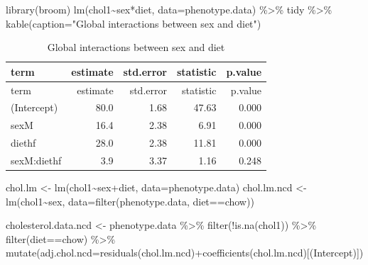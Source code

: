 \documentclass[
]{article}
\newenvironment{Shaded}{\begin{snugshade}}{\end{snugshade}}
\newcommand{\AttributeTok}[1]{\textcolor[rgb]{0.77,0.63,0.00}{#1}}
\newcommand{\FunctionTok}[1]{\textcolor[rgb]{0.00,0.00,0.00}{#1}}
\newcommand{\NormalTok}[1]{#1}
\newcommand{\OtherTok}[1]{\textcolor[rgb]{0.56,0.35,0.01}{#1}}
\newcommand{\SpecialCharTok}[1]{\textcolor[rgb]{0.00,0.00,0.00}{#1}}
\newcommand{\StringTok}[1]{\textcolor[rgb]{0.31,0.60,0.02}{#1}}
\begin{document}
\begin{Shaded}
\begin{Highlighting}[]
\FunctionTok{library}\NormalTok{(broom)}
\FunctionTok{lm}\NormalTok{(chol1}\SpecialCharTok{\textasciitilde{}}\NormalTok{sex}\SpecialCharTok{*}\NormalTok{diet, }\AttributeTok{data=}\NormalTok{phenotype.data) }\SpecialCharTok{\%\textgreater{}\%}
\NormalTok{  tidy }\SpecialCharTok{\%\textgreater{}\%}
  \FunctionTok{kable}\NormalTok{(}\AttributeTok{caption=}\StringTok{"Global interactions between sex and diet"}\NormalTok{)}
\end{Highlighting}
\end{Shaded}

\begin{longtable}[]{@{}lrrrr@{}}
\caption{Global interactions between sex and diet}\tabularnewline
\toprule()
term & estimate & std.error & statistic & p.value \\
\midrule()
\endfirsthead
\toprule()
term & estimate & std.error & statistic & p.value \\
\midrule()
\endhead
(Intercept) & 80.0 & 1.68 & 47.63 & 0.000 \\
sexM & 16.4 & 2.38 & 6.91 & 0.000 \\
diethf & 28.0 & 2.38 & 11.81 & 0.000 \\
sexM:diethf & 3.9 & 3.37 & 1.16 & 0.248 \\
\bottomrule()
\end{longtable}

\begin{Shaded}
\begin{Highlighting}[]
\NormalTok{chol.lm }\OtherTok{\textless{}{-}} \FunctionTok{lm}\NormalTok{(chol1}\SpecialCharTok{\textasciitilde{}}\NormalTok{sex}\SpecialCharTok{+}\NormalTok{diet, }\AttributeTok{data=}\NormalTok{phenotype.data)}
\NormalTok{chol.lm.ncd }\OtherTok{\textless{}{-}} \FunctionTok{lm}\NormalTok{(chol1}\SpecialCharTok{\textasciitilde{}}\NormalTok{sex, }\AttributeTok{data=}\FunctionTok{filter}\NormalTok{(phenotype.data, diet}\SpecialCharTok{==}\StringTok{\textquotesingle{}chow\textquotesingle{}}\NormalTok{))}

\NormalTok{cholesterol.data.ncd }\OtherTok{\textless{}{-}}
\NormalTok{  phenotype.data }\SpecialCharTok{\%\textgreater{}\%}
  \FunctionTok{filter}\NormalTok{(}\SpecialCharTok{!}\FunctionTok{is.na}\NormalTok{(chol1)) }\SpecialCharTok{\%\textgreater{}\%}
  \FunctionTok{filter}\NormalTok{(diet}\SpecialCharTok{==}\StringTok{\textquotesingle{}chow\textquotesingle{}}\NormalTok{) }\SpecialCharTok{\%\textgreater{}\%}
  \FunctionTok{mutate}\NormalTok{(}\AttributeTok{adj.chol.ncd=}\FunctionTok{residuals}\NormalTok{(chol.lm.ncd)}\SpecialCharTok{+}\FunctionTok{coefficients}\NormalTok{(chol.lm.ncd)[}\StringTok{\textquotesingle{}(Intercept)\textquotesingle{}}\NormalTok{])}
\end{Highlighting}
\end{Shaded}
\end{document}
